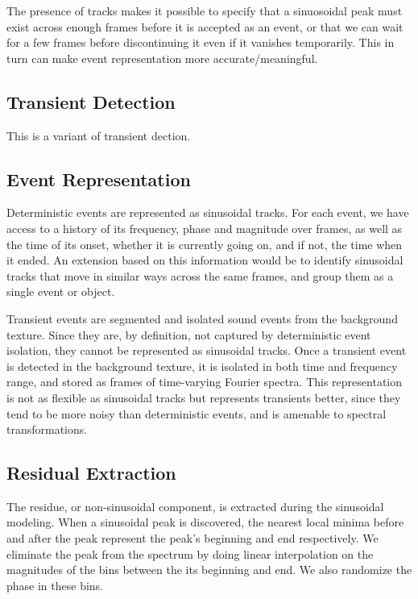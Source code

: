\documentclass{acmsiggraph}               %
\begin{document}
The presence of tracks makes it possible to specify that a sinuosoidal 
peak must exist across enough frames before it is accepted as an event, or 
that we can wait for a few frames before discontinuing it even if it 
vanishes temporarily. This in turn can make event representation more 
accurate/meaningful.

\subsection{Transient Detection}

This is a variant of transient dection.

\subsection{Event Representation}

Deterministic events are represented as sinusoidal tracks. For each event, we have 
access to a history of its frequency, phase and magnitude over frames, as 
well as the time of its onset, whether it is currently going on, and if 
not, the time when it ended. An extension based on this information would 
be to identify sinusoidal tracks that move in similar ways across the same 
frames, and group them as a single event or object.

Transient events are segmented and isolated sound events from the background texture.
Since they are, by definition, not captured by deterministic event isolation, they cannot be
represented as sinusoidal tracks.  Once a transient event is detected in the background
texture, it is isolated in both time and frequency range, and stored as frames of time-varying
Fourier spectra.  This representation is not as flexible as sinusoidal tracks but represents
transients better, since they tend to be more noisy than deterministic events, and is amenable
to spectral transformations.

\subsection{Residual Extraction}

The residue, or non-sinusoidal component, is extracted during the 
sinusoidal modeling. When a sinusoidal peak is discovered, the 
nearest local minima before and after the peak represent the peak's 
beginning and end respectively. We eliminate the peak from the spectrum by 
doing linear interpolation on the magnitudes of the bins between the its
beginning and end. We also randomize the phase in these 
bins.
\end{document}
